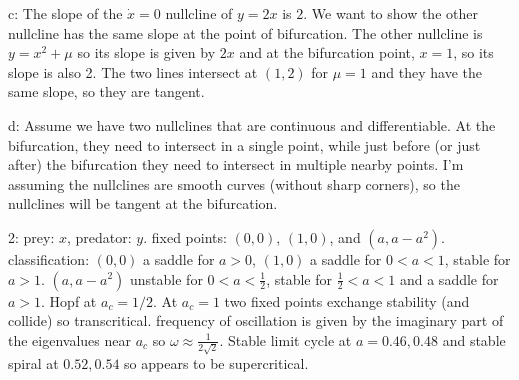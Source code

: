 \documentclass[12pt,letterpaper,noanswers]{exam}
\begin{document}
c: The slope of the $\dot{x} = 0$ nullcline of $y = 2x$ is $2$.  We want to show the other nullcline has the same slope at the point
of bifurcation.  The other nullcline is $y = x^2 + \mu$ so its slope is given by $2x$ and at the bifurcation point, $x = 1$, so its slope is also 2.
The two lines intersect at $(1,2)$ for $\mu = 1$ and they have the same slope, so they are tangent.

d: Assume we have two nullclines that are continuous and differentiable.  At the bifurcation, they need to intersect in a single point, while just before (or just after) the bifurcation they need to intersect in multiple nearby points.  I'm assuming the nullclines are smooth curves (without sharp corners), so the nullclines will be tangent at the bifurcation.

2: prey: $x$, predator: $y$.  fixed points: $(0,0)$, $(1,0)$, and $(a,a-a^2)$.  classification: $(0,0)$ a saddle for $a>0$, $(1,0)$ a saddle for $0<a<1$, stable for $a>1$.  $(a,a-a^2)$ unstable for $0<a<\frac{1}{2}$, stable for $\frac{1}{2}<a<1$ and a saddle for $a>1$.  Hopf at $a_c = 1/2$.   At $a_c = 1$ two fixed points exchange stability (and collide) so transcritical.  frequency of oscillation is given by the imaginary part of the eigenvalues near $a_c$ so $\omega \approx \frac{1}{2\sqrt{2}}$. Stable limit cycle at $a = 0.46, 0.48$ and stable spiral at $0.52,0.54$ so appears to be supercritical.
\end{document}
